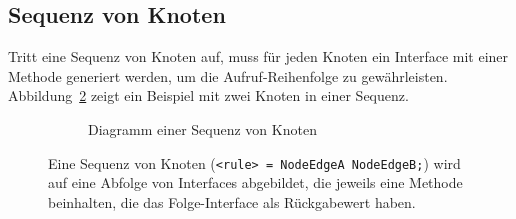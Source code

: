 \documentclass[../InterneDSLs.tex]{subfiles}
\begin{document}
\subsection{Sequenz von Knoten}\label{SEC:Sequence}
Tritt eine Sequenz von Knoten auf, muss für jeden Knoten ein Interface mit einer Methode generiert werden, um die Aufruf-Reihenfolge zu gewährleisten. Abbildung~\ref{FIG:SequenceNode} zeigt ein Beispiel mit zwei Knoten in einer Sequenz.
\begin{figure}[ht]
\centering
  \begin{subfigure}[c]{0.49\textwidth}
    \caption{Diagramm einer Sequenz von Knoten}
    \label{FIG:DiagramSequenceNode}
  \end{subfigure}
  \begin{subfigure}[c]{0.49\textwidth}
    
  \end{subfigure}
  \caption{Eine Sequenz von Knoten (\texttt{<rule> = NodeEdgeA NodeEdgeB;}) wird auf eine Abfolge von Interfaces abgebildet, die jeweils eine Methode beinhalten, die das Folge-Interface als Rückgabewert haben.}
  \label{FIG:SequenceNode}
\end{figure}
\end{document}
